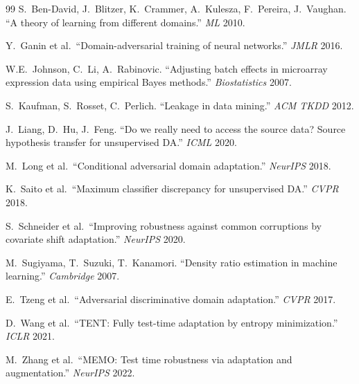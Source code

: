 \documentclass{article}
\begin{document}

\begin{thebibliography}{99}
S.\ Ben-David, J.\ Blitzer, K.\ Crammer, A.\ Kulesza, F.\ Pereira, J.\
Vaughan. ``A theory of learning from different domains.'' \emph{ML} 2010.

Y.\ Ganin et al.\ ``Domain-adversarial training of neural networks.''
\emph{JMLR} 2016.

W.E.\ Johnson, C.\ Li, A.\ Rabinovic. ``Adjusting batch effects in
microarray expression data using empirical Bayes methods.''
\emph{Biostatistics} 2007.

S.\ Kaufman, S.\ Rosset, C.\ Perlich. ``Leakage in data mining.''
\emph{ACM TKDD} 2012.

J.\ Liang, D.\ Hu, J.\ Feng. ``Do we really need to access the source
data? Source hypothesis transfer for unsupervised DA.'' \emph{ICML} 2020.

M.\ Long et al.\ ``Conditional adversarial domain adaptation.''
\emph{NeurIPS} 2018.

K.\ Saito et al.\ ``Maximum classifier discrepancy for unsupervised DA.''
\emph{CVPR} 2018.

S.\ Schneider et al.\ ``Improving robustness against common corruptions by
covariate shift adaptation.'' \emph{NeurIPS} 2020.

M.\ Sugiyama, T.\ Suzuki, T.\ Kanamori. ``Density ratio estimation in
machine learning.'' \emph{Cambridge} 2007.

E.\ Tzeng et al.\ ``Adversarial discriminative domain adaptation.''
\emph{CVPR} 2017.

D.\ Wang et al.\ ``TENT: Fully test-time adaptation by entropy
minimization.'' \emph{ICLR} 2021.

M.\ Zhang et al.\ ``MEMO: Test time robustness via adaptation and
augmentation.'' \emph{NeurIPS} 2022.

\end{thebibliography}
\end{document}
